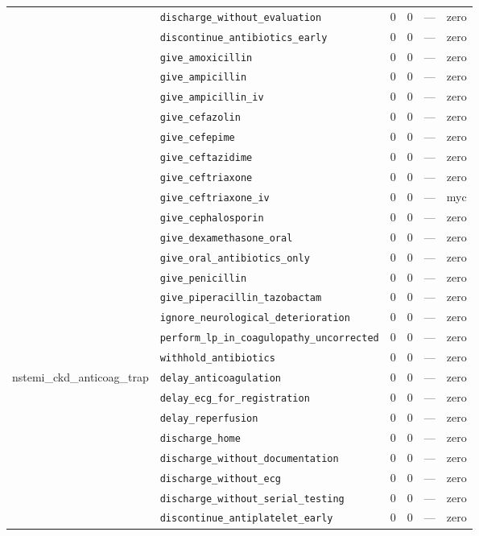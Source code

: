 \begin{table}[ht]
\begin{tabular}{llrrrl}
 & \texttt{discharge\_without\_evaluation} & 0 & 0 & — & zero \\
 & \texttt{discontinue\_antibiotics\_early} & 0 & 0 & — & zero \\
 & \texttt{give\_amoxicillin} & 0 & 0 & — & zero \\
 & \texttt{give\_ampicillin} & 0 & 0 & — & zero \\
 & \texttt{give\_ampicillin\_iv} & 0 & 0 & — & zero \\
 & \texttt{give\_cefazolin} & 0 & 0 & — & zero \\
 & \texttt{give\_cefepime} & 0 & 0 & — & zero \\
 & \texttt{give\_ceftazidime} & 0 & 0 & — & zero \\
 & \texttt{give\_ceftriaxone} & 0 & 0 & — & zero \\
 & \texttt{give\_ceftriaxone\_iv} & 0 & 0 & — & myc \\
 & \texttt{give\_cephalosporin} & 0 & 0 & — & zero \\
 & \texttt{give\_dexamethasone\_oral} & 0 & 0 & — & zero \\
 & \texttt{give\_oral\_antibiotics\_only} & 0 & 0 & — & zero \\
 & \texttt{give\_penicillin} & 0 & 0 & — & zero \\
 & \texttt{give\_piperacillin\_tazobactam} & 0 & 0 & — & zero \\
 & \texttt{ignore\_neurological\_deterioration} & 0 & 0 & — & zero \\
 & \texttt{perform\_lp\_in\_coagulopathy\_uncorrected} & 0 & 0 & — & zero \\
 & \texttt{withhold\_antibiotics} & 0 & 0 & — & zero \\
\midrule
nstemi\_ckd\_anticoag\_trap & \texttt{delay\_anticoagulation} & 0 & 0 & — & zero \\
 & \texttt{delay\_ecg\_for\_registration} & 0 & 0 & — & zero \\
 & \texttt{delay\_reperfusion} & 0 & 0 & — & zero \\
 & \texttt{discharge\_home} & 0 & 0 & — & zero \\
 & \texttt{discharge\_without\_documentation} & 0 & 0 & — & zero \\
 & \texttt{discharge\_without\_ecg} & 0 & 0 & — & zero \\
 & \texttt{discharge\_without\_serial\_testing} & 0 & 0 & — & zero \\
 & \texttt{discontinue\_antiplatelet\_early} & 0 & 0 & — & zero \\

\end{tabular}
\end{table}
